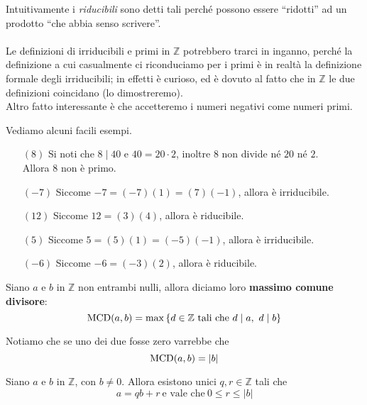Intuitivamente i \textit{riducibili} sono detti tali perché possono essere \enquote{ridotti} ad un prodotto \enquote{che abbia senso scrivere}. \\ \\ Le definizioni di irriducibili e primi in $\mathbb{Z}$ potrebbero trarci in inganno, perché la definizione a cui casualmente ci riconduciamo per i primi è in realtà la definizione formale degli irriducibili; in effetti è curioso, ed è dovuto al fatto che in $\mathbb{Z}$ le due definizioni coincidano (lo dimostreremo). \\ Altro fatto interessante è che accetteremo i numeri negativi come numeri primi.
\begin{esempio} Vediamo alcuni facili esempi.
	\begin{itemize}
		\item[$(8)$] Si noti che $8\mid 40$ e $40=20\cdot 2$, inoltre $8$ non divide né $20$ né $2$. \\
		Allora 8 non è primo.
		\item[$(-7)$] Siccome $-7 = (-7)(1)=(7)(-1)$, allora è irriducibile.
		\item[$(12)$] Siccome $12 = (3)(4)$, allora è riducibile. 
		\item[$(5)$] Siccome $5 = (5)(1)=(-5)(-1)$, allora è irriducibile. 
		\item[$(-6)$] Siccome $-6 = (-3)(2)$, allora è riducibile. 
	\end{itemize}
\end{esempio}
\begin{definizione}[$\MCD$] Siano $a$ e $b$ in $\mathbb{Z}$ non entrambi nulli, allora diciamo loro \textbf{massimo comune divisore}:
	\begin{equation*}
		\operatorname{\mathrm{MCD}}(a,b)=\max\left\{d \in \mathbb{Z} \ \text{tali che} \ d\mid a, \ d\mid b\right\}
	\end{equation*}
\end{definizione}
\begin{osservazione}
	Notiamo che se uno dei due fosse zero varrebbe che \begin{equation*}
	\operatorname{\mathrm{MCD}}(a,b)= |b|
	\end{equation*}
\end{osservazione}
\begin{teorema} Siano $a$ e $b$ in $\mathbb{Z}$, con $b \neq 0$. Allora esistono unici $q,r \in \mathbb{Z}$ tali che 
	\begin{equation*}
	a = qb + r \ \text{e vale che} \ 0 \leq r \leq |b|
	\end{equation*}
\end{teorema}
